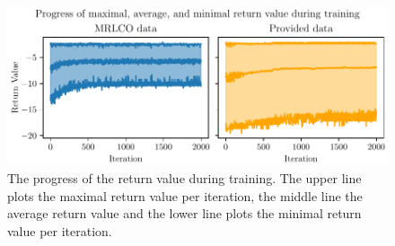 \begin{figure}[htp!]
    \centering
    \includegraphics[width=\textwidth]{./fig/return.pdf}
    \caption{The progress of the return value during training. The upper line
    plots the maximal return value per iteration, the middle line the average
    return value and the lower line plots the minimal return value per
    iteration.}
    \label{fig:return}
\end{figure}
